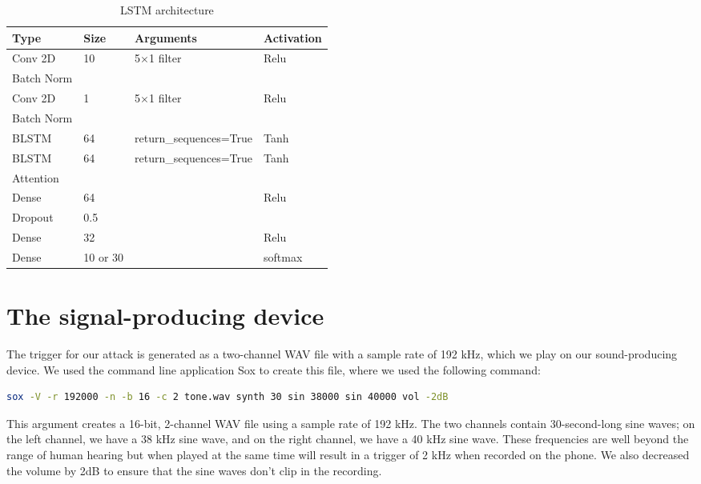 \documentclass{report}
\theoremstyle{definition}
\theoremstyle{remark}
\begin{document}
\begin{table}[!hbt]
    \centering
    \small
\begin{tabularx}{0.7\textwidth}{llll}
            \hline
            Type & Size & Arguments & Activation \\ \hline
            Conv 2D & 10 & 5$\times$1 filter & Relu \\ 
            Batch Norm &  &  &  \\ 
            Conv 2D & 1 & 5$\times$1 filter & Relu \\ 
            Batch Norm &  &  &  \\ 
            BLSTM & 64 & return\_sequences=True & Tanh \\ 
            BLSTM & 64 & return\_sequences=True & Tanh \\ 
            Attention & & & \\ 
            Dense & 64 &  & Relu \\
            Dropout & 0.5 &  &  \\ 
            Dense & 32 &  & Relu \\ 
            Dense & 10 or 30 &  & softmax \\ \hline
        \end{tabularx}
        \caption{LSTM architecture}
    \label{tab:lstm}
\end{table}

\section{The signal-producing device \label{TRIGGER}}
The trigger for our attack is generated as a two-channel WAV file with a sample rate of 192 kHz, which we play on our sound-producing device. We used the command line application Sox to create this file, where we used the following command:
\begin{lstlisting}[language=bash]
sox -V -r 192000 -n -b 16 -c 2 tone.wav synth 30 sin 38000 sin 40000 vol -2dB
\end{lstlisting}
This argument creates a 16-bit, 2-channel WAV file using a sample rate of 192 kHz. The two channels contain 30-second-long sine waves; on the left channel, we have a 38 kHz sine wave, and on the right channel, we have a 40 kHz sine wave. These frequencies are well beyond the range of human hearing but when played at the same time will result in a trigger of 2 kHz when recorded on the phone. We also decreased the volume by 2dB to ensure that the sine waves don't clip in the recording.
\end{document}
